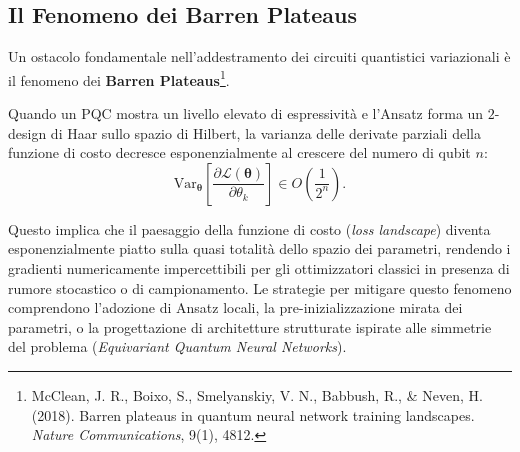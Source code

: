 \subsection{Il Fenomeno dei Barren Plateaus}
\label{sec:barren_plateaus}
Un ostacolo fondamentale nell'addestramento dei circuiti quantistici variazionali è il fenomeno dei \textbf{Barren Plateaus}\footnote{McClean, J. R., Boixo, S., Smelyanskiy, V. N., Babbush, R., \& Neven, H. (2018). Barren plateaus in quantum neural network training landscapes. \textit{Nature Communications}, 9(1), 4812.}.

Quando un PQC mostra un livello elevato di espressività e l'Ansatz forma un $2$-design di Haar sullo spazio di Hilbert, la varianza delle derivate parziali della funzione di costo decresce esponenzialmente al crescere del numero di qubit $n$:
\begin{equation}
\text{Var}_{\boldsymbol{\theta}} \left[ \frac{\partial \mathcal{L}(\boldsymbol{\theta})}{\partial \theta_k} \right] \in O\left( \frac{1}{2^n} \right).
\end{equation}

Questo implica che il paesaggio della funzione di costo (\textit{loss landscape}) diventa esponenzialmente piatto sulla quasi totalità dello spazio dei parametri, rendendo i gradienti numericamente impercettibili per gli ottimizzatori classici in presenza di rumore stocastico o di campionamento. Le strategie per mitigare questo fenomeno comprendono l'adozione di Ansatz locali, la pre-inizializzazione mirata dei parametri, o la progettazione di architetture strutturate ispirate alle simmetrie del problema (\textit{Equivariant Quantum Neural Networks}).

